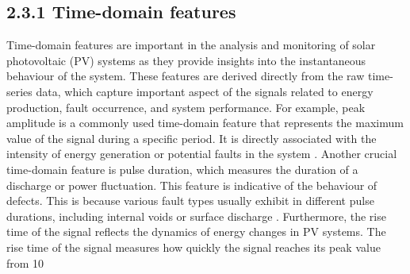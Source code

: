 \subsection{2.3.1 Time-domain features}
Time-domain features are important in the analysis and monitoring of solar photovoltaic (PV) systems as they provide insights into the instantaneous behaviour of the system. These features are derived directly from the raw time-series data, which capture important aspect of the signals related to energy production, fault occurrence, and system performance. For example, peak amplitude is a commonly used time-domain feature that represents the maximum value of the signal during a specific period. It is directly associated with the intensity of energy generation or potential faults in the system \parencite{Kumar et al._2020}. Another crucial time-domain feature is pulse duration, which measures the duration of a discharge or power fluctuation. This feature is indicative of the behaviour of defects. This is because various fault types usually exhibit in different pulse durations, including internal voids or surface discharge \parencite{Shen et al._2020}. Furthermore, the rise time of the signal reflects the dynamics of energy changes in PV systems. The rise time of the signal measures how quickly the signal reaches its peak value from 10%
